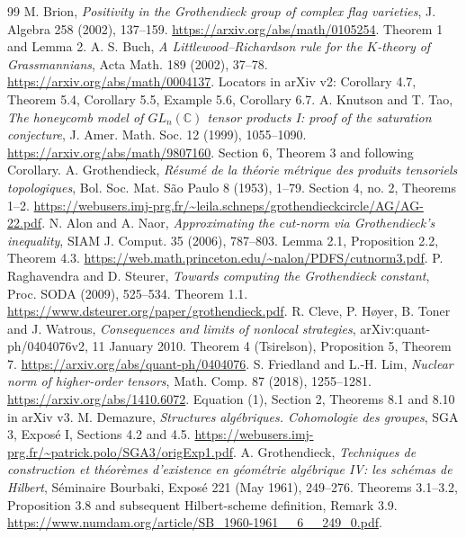 \documentclass[11pt,a4paper]{article}
\begin{document}
\begin{thebibliography}{99}
 M. Brion, \emph{Positivity in the Grothendieck group of complex flag varieties}, J. Algebra 258 (2002), 137--159. \url{https://arxiv.org/abs/math/0105254}. Theorem 1 and Lemma 2.
 A. S. Buch, \emph{A Littlewood--Richardson rule for the $K$-theory of Grassmannians}, Acta Math. 189 (2002), 37--78. \url{https://arxiv.org/abs/math/0004137}. Locators in arXiv v2: Corollary 4.7, Theorem 5.4, Corollary 5.5, Example 5.6, Corollary 6.7.
 A. Knutson and T. Tao, \emph{The honeycomb model of $GL_n(\mathbb C)$ tensor products I: proof of the saturation conjecture}, J. Amer. Math. Soc. 12 (1999), 1055--1090. \url{https://arxiv.org/abs/math/9807160}. Section 6, Theorem 3 and following Corollary.
 A. Grothendieck, \emph{R\'esum\'e de la th\'eorie m\'etrique des produits tensoriels topologiques}, Bol. Soc. Mat. S\~ao Paulo 8 (1953), 1--79. Section 4, no. 2, Theorems 1--2. \url{https://webusers.imj-prg.fr/~leila.schneps/grothendieckcircle/AG/AG-22.pdf}.
 N. Alon and A. Naor, \emph{Approximating the cut-norm via Grothendieck's inequality}, SIAM J. Comput. 35 (2006), 787--803. Lemma 2.1, Proposition 2.2, Theorem 4.3. \url{https://web.math.princeton.edu/~nalon/PDFS/cutnorm3.pdf}.
 P. Raghavendra and D. Steurer, \emph{Towards computing the Grothendieck constant}, Proc. SODA (2009), 525--534. Theorem 1.1. \url{https://www.dsteurer.org/paper/grothendieck.pdf}.
 R. Cleve, P. H\o yer, B. Toner and J. Watrous, \emph{Consequences and limits of nonlocal strategies}, arXiv:quant-ph/0404076v2, 11 January 2010. Theorem 4 (Tsirelson), Proposition 5, Theorem 7. \url{https://arxiv.org/abs/quant-ph/0404076}.
 S. Friedland and L.-H. Lim, \emph{Nuclear norm of higher-order tensors}, Math. Comp. 87 (2018), 1255--1281. \url{https://arxiv.org/abs/1410.6072}. Equation (1), Section 2, Theorems 8.1 and 8.10 in arXiv v3.
 M. Demazure, \emph{Structures alg\'ebriques. Cohomologie des groupes}, SGA 3, Expos\'e I, Sections 4.2 and 4.5. \url{https://webusers.imj-prg.fr/~patrick.polo/SGA3/origExp1.pdf}.
 A. Grothendieck, \emph{Techniques de construction et th\'eor\`emes d'existence en g\'eom\'etrie alg\'ebrique IV: les sch\'emas de Hilbert}, S\'eminaire Bourbaki, Expos\'e 221 (May 1961), 249--276. Theorems 3.1--3.2, Proposition 3.8 and subsequent Hilbert-scheme definition, Remark 3.9. \url{https://www.numdam.org/article/SB_1960-1961__6__249_0.pdf}.



\end{thebibliography}
\end{document}
